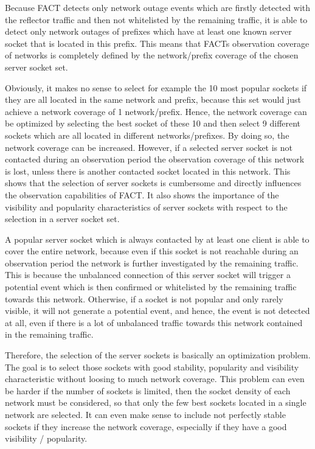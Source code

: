 Because \gls{FACT} detects only network outage events which are firstly detected 
with the reflector traffic and then not whitelisted by the remaining traffic, it 
is able to detect only network outages of prefixes which have at least one known 
server socket that is located in this prefix. This means that FACTs observation 
coverage of networks is completely defined by the network/prefix coverage of the 
chosen \gls{server socket} set. 

Obviously, it makes no sense to select for example the 10 most popular sockets 
if they are all located in the same network and prefix, because this set would 
just achieve a network coverage of 1 network/prefix. Hence, the network coverage 
can be optimized by selecting the best socket of these 10 and then select 9 
different sockets which are all located in different networks/prefixes. By doing 
so, the network coverage can be increased. However, if a selected 
\gls{server socket} is not contacted during an observation period the 
observation coverage of this network is lost, unless there is another contacted 
socket located in this network. 
This shows that the selection of \glspl{server socket} is cumbersome and 
directly influences the observation capabilities of FACT. It also shows the 
importance of the visibility and popularity characteristics of 
\glspl{server socket} with respect to the selection in a \gls{server socket} 
set. 

A popular \gls{server socket} which is always contacted by at least one client 
is able to cover the entire network, because even if this socket is not 
reachable during an observation period the network is further investigated by 
the remaining traffic. 
This is because the unbalanced connection of this \gls{server socket} 
will trigger a potential event which is then confirmed or whitelisted by the 
remaining traffic towards this network. Otherwise, if a socket is not popular 
and only rarely visible, it will not generate a potential event, and hence, the 
event is not detected at all, even if there is a lot of unbalanced traffic 
towards this network contained in the remaining traffic. 

Therefore, the selection of the \glspl{server socket} is basically an 
optimization problem. 
The goal is to select those sockets with good stability, popularity and 
visibility characteristic without loosing to much network coverage. This problem 
can even be harder if the number of sockets is limited, then the socket density 
of each network must be considered, so that only the few best sockets located in 
a single network are selected. It can even make sense to include not perfectly 
stable sockets if they increase the network coverage, especially if they have a 
good visibility / popularity.


